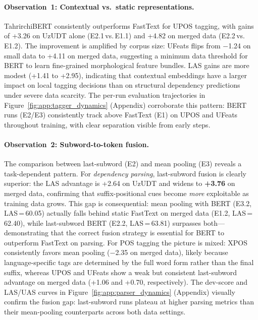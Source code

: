 \documentclass[runningheads]{llncs}
\begin{document}
\paragraph{Observation~1: Contextual vs.\ static representations.}
TahrirchiBERT consistently outperforms FastText for UPOS tagging, with gains of +3.26 on UzUDT alone (E2.1\,vs.\,E1.1) and +4.82 on merged data (E2.2\,vs.\,E1.2).
The improvement is amplified by corpus size: UFeats flips from $-$1.24 on small data to +4.11 on merged data, suggesting a minimum data threshold for BERT to learn fine-grained morphological feature bundles.
LAS gains are more modest (+1.41 to +2.95), indicating that contextual embeddings have a larger impact on local tagging decisions than on structural dependency predictions under severe data scarcity.
The per-run evaluation trajectories in Figure~\ref{fig:app:tagger_dynamics} (Appendix) corroborate this pattern: BERT runs (E2/E3) consistently track above FastText (E1) on UPOS and UFeats throughout training, with clear separation visible from early steps.

\paragraph{Observation~2: Subword-to-token fusion.}
The comparison between last-subword (E2) and mean pooling (E3) reveals a task-dependent pattern.
For \emph{dependency parsing}, last-subword fusion is clearly superior: the LAS advantage is +2.64 on UzUDT and widens to \textbf{+3.76} on merged data, confirming that suffix-positional cues become \emph{more} exploitable as training data grows.
This gap is consequential: mean pooling with BERT (E3.2, LAS\,=\,60.05) actually falls behind static FastText on merged data (E1.2, LAS\,=\,62.40), while last-subword BERT (E2.2, LAS\,=\,63.81) surpasses both---demonstrating that the correct fusion strategy is essential for BERT to outperform FastText on parsing.
For POS tagging the picture is mixed: XPOS consistently favors mean pooling ($-$2.35 on merged data), likely because language-specific tags are determined by the full word form rather than the final suffix, whereas UPOS and UFeats show a weak but consistent last-subword advantage on merged data (+1.06 and +0.70, respectively).
The dev-score and LAS/UAS curves in Figure~\ref{fig:app:parser_dynamics} (Appendix) visually confirm the fusion gap: last-subword runs plateau at higher parsing metrics than their mean-pooling counterparts across both data settings.
\end{document}
